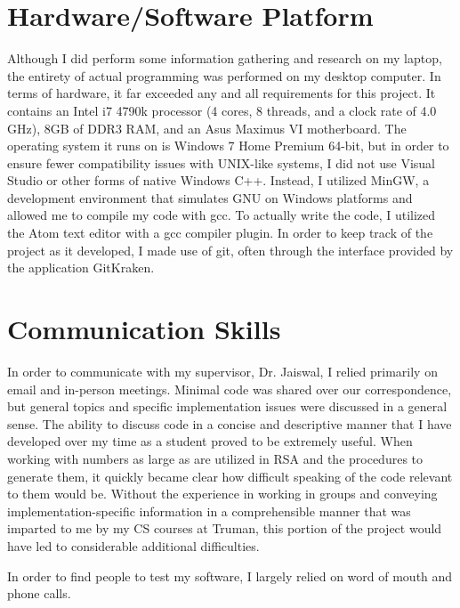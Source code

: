 \documentclass[11pt]{article}
\begin{document}
\section{Hardware/Software Platform}
Although I did perform some information gathering and research on my laptop, the entirety of actual programming was performed on my desktop computer. In terms of hardware, it far exceeded any and all requirements for this project. It contains an Intel i7 4790k processor (4 cores, 8 threads, and a clock rate of 4.0 GHz), 8GB of DDR3 RAM, and an Asus Maximus VI motherboard. The operating system it runs on is Windows 7 Home Premium 64-bit, but in order to ensure fewer compatibility issues with UNIX-like systems, I did not use Visual Studio or other forms of native Windows C++. Instead, I utilized MinGW, a development environment that simulates GNU on Windows platforms and allowed me to compile my code with gcc. To actually write the code, I utilized the Atom text editor with a gcc compiler plugin. In order to keep track of the project as it developed, I made use of git, often through the interface provided by the application GitKraken.

\section{Communication Skills}
In order to communicate with my supervisor, Dr. Jaiswal, I relied primarily on email and in-person meetings. Minimal code was shared over our correspondence, but general topics and specific implementation issues were discussed in a general sense. The ability to discuss code in a concise and descriptive manner that I have developed over my time as a student proved to be extremely useful. When working with numbers as large as are utilized in RSA and the procedures to generate them, it quickly became clear how difficult speaking of the code relevant to them would be. Without the experience in working in groups and conveying implementation-specific information in a comprehensible manner that was imparted to me by my CS courses at Truman, this portion of the project would have led to considerable additional difficulties.

In order to find people to test my software, I largely relied on word of mouth and phone calls.
\end{document}
